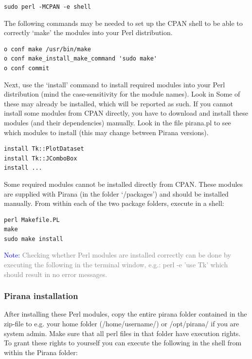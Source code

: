 \begin{lstlisting}
sudo perl -MCPAN -e shell
\end{lstlisting}

\noindent The following commands may be needed to set up the CPAN
shell to be able to correctly `make' the modules into your Perl distribution.
\begin{lstlisting}
o conf make /usr/bin/make
o conf make_install_make_command 'sudo make'
o conf commit
\end{lstlisting}

\noindent Next, use the `install' command to install required modules
into your Perl distribution (mind the case-sensitivity for the module
names). Look in Some of these may already be installed, which will be reported
as such. If you cannot install some modules from CPAN directly, you
have to download and install these modules (and their
dependencies) manually. Look in the file pirana.pl to see which
modules to install (this may change between Pirana versions).

\begin{lstlisting}
install Tk::PlotDataset
install Tk::JComboBox
install ...
\end{lstlisting}

\noindent Some required modules cannot be installed directly from
CPAN. These modules are supplied with Pirana (in the folder
`/packages') and should be installed manually. From within each of the
two package folders, execute in a shell:

\begin{lstlisting}
perl Makefile.PL
make
sudo make install
\end{lstlisting}

\vspace{8pt}
\noindent\scriptsize{\textcolor{Blue}{Note:} \textcolor{Grey}{Checking
whether Perl modules are installed correctly can be done by executing the
following in the terminal window, e.g.: perl -e 'use Tk' which should
result in no error messages.\\ } } \normalsize

\subsubsection*{Pirana installation}
\noindent After installing these Perl modules, copy the entire pirana
folder contained in the zip-file to e.g. your home folder
(/home/username/) or /opt/pirana/ if you are system
admin. Make sure that all perl files in that folder have
execution rights. To grant these rights to yourself you can execute
the following in the shell from within the Pirana folder:

